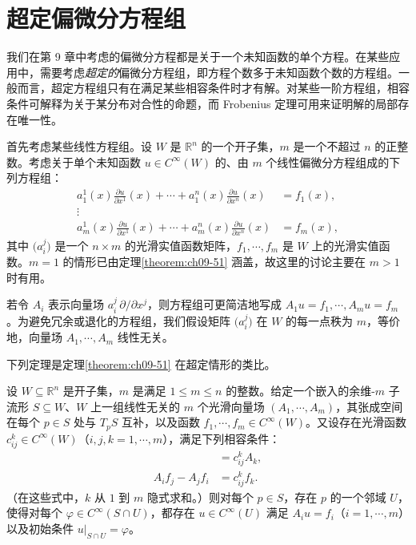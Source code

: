 \documentclass[../../main.tex]{subfiles}
\begin{document}
\section{超定偏微分方程组}\label{section:ch19-overdetermined}

我们在第 9 章中考虑的偏微分方程都是关于一个未知函数的单个方程。在某些应用中，需要考虑\emph{超定的}偏微分方程组，即方程个数多于未知函数个数的方程组。一般而言，超定方程组只有在满足某些相容条件时才有解。对某些一阶方程组，相容条件可解释为关于某分布对合性的命题，而 Frobenius 定理可用来证明解的局部存在唯一性。

首先考虑某些线性方程组。设 $W$ 是 $\mathbb{R}^n$ 的一个开子集，$m$ 是一个不超过 $n$ 的正整数。考虑关于单个未知函数 $u\in C^\infty(W)$ 的、由 $m$ 个线性偏微分方程组成的下列方程组：
\begin{align}
a^1_1(x)\frac{\partial u}{\partial x^1}(x)+\cdots+a^n_1(x)\frac{\partial u}{\partial x^n}(x)&=f_1(x),\nonumber\\
\vdots\qquad\qquad&\\
a^1_m(x)\frac{\partial u}{\partial x^1}(x)+\cdots+a^n_m(x)\frac{\partial u}{\partial x^n}(x)&=f_m(x),\nonumber
\end{align}
其中 $\bigl(a^j_i\bigr)$ 是一个 $n\times m$ 的光滑实值函数矩阵，$f_1,\cdots ,f_m$ 是 $W$ 上的光滑实值函数。$m=1$ 的情形已由定理\cref{theorem:ch09-51} 涵盖，故这里的讨论主要在 $m>1$ 时有用。

若令 $A_i$ 表示向量场 $a^j_i\,\partial/\partial x^j$，则方程组可更简洁地写成 $A_1u=f_1,\cdots ,A_mu=f_m$。为避免冗余或退化的方程组，我们假设矩阵 $\bigl(a^j_i\bigr)$ 在 $W$ 的每一点秩为 $m$，等价地，向量场 $A_1,\cdots ,A_m$ 线性无关。

下列定理是定理\cref{theorem:ch09-51} 在超定情形的类比。

\begin{theorem}\label{theorem:ch19-超定线性}
设 $W\subseteq\mathbb{R}^n$ 是开子集，$m$ 是满足 $1\leqslant m\leqslant n$ 的整数。给定一个嵌入的余维-$m$ 子流形 $S\subseteq W$、$W$ 上一组线性无关的 $m$ 个光滑向量场 $(A_1,\cdots ,A_m)$，其张成空间在每个 $p\in S$ 处与 $T_pS$ 互补，以及函数 $f_1,\cdots ,f_m\in C^\infty(W)$。又设存在光滑函数 $c^k_{ij}\in C^\infty(W)$（$i,j,k=1,\cdots ,m$），满足下列相容条件：
\begin{align}
[A_i,A_j]&=c^k_{ij}A_k,\\
A_i f_j-A_j f_i&=c^k_{ij}f_k.
\end{align}
（在这些式中，$k$ 从 $1$ 到 $m$ 隐式求和。）则对每个 $p\in S$，存在 $p$ 的一个邻域 $U$，使得对每个 $\varphi\in C^\infty(S\cap U)$，都存在 $u\in C^\infty(U)$ 满足 $A_i u=f_i$（$i=1,\cdots ,m$）以及初始条件 $u|_{S\cap U}=\varphi$。
\end{theorem}
\end{document}
